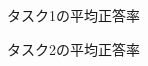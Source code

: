 \documentclass[syuuron]{kuee}
\begin{document}
		\begin{figure}
			\begin{center}
			\end{center}
			\caption{タスク1の平均正答率}
	  		\label{fig:res4}
		\end{figure}
		\begin{figure}
			\begin{center}
			\end{center}
			\caption{タスク2の平均正答率}
	  		\label{fig:res5}
		\end{figure}
\end{document}
